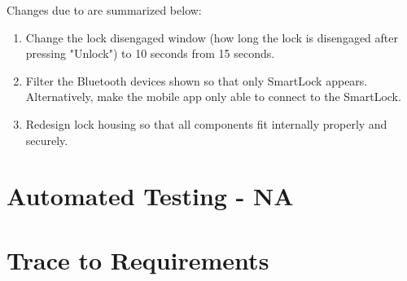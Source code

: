\documentclass[12pt, titlepage]{article}
\begin{document}

Changes due to  are summarized below:

\begin{enumerate}
    \item Change the lock disengaged window (how long the lock is disengaged after pressing "Unlock") to 10 seconds from 15 seconds.
    \item Filter the Bluetooth devices shown so that only SmartLock appears. Alternatively, make the mobile app only able to connect to the SmartLock.
    \item Redesign lock housing so that all components fit internally properly and securely. 
\end{enumerate}

\section{Automated Testing - NA}
		
\section{Trace to Requirements}
\end{document}
